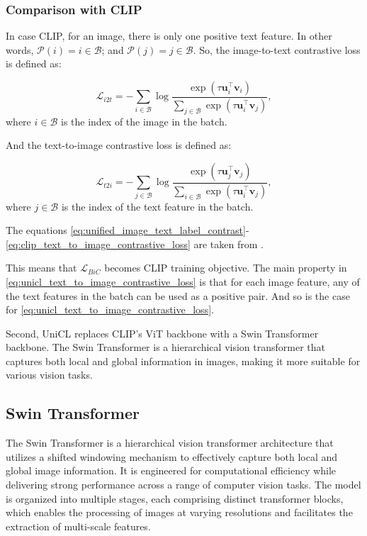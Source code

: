 \subsubsection{Comparison with CLIP}
\label{subsec:clip_vs_unicl}

In case CLIP, for an image, there is only one positive text feature. In other words, $\mathcal{P}(i) = {i} \in \mathcal{B}$; and $\mathcal{P}(j) = {j} \in \mathcal{B}$. So, the image-to-text contrastive loss is defined as:

\begin{equation} \label{eq:clip_image_to_text_contrastive_loss}
    \mathcal{L}_{i2t} = - \sum_{i \in \mathcal{B}} 
    \log \frac{\exp(\tau \mathbf{u}_i^\top \mathbf{v}_i)}{\sum_{j \in \mathcal{B}} \exp(\tau \mathbf{u}_i^\top \mathbf{v}_j)},
\end{equation}
where $i \in \mathcal{B}$ is the index of the image in the batch.

And the text-to-image contrastive loss is defined as:

\begin{equation} \label{eq:clip_text_to_image_contrastive_loss}
    \mathcal{L}_{t2i} = - \sum_{j \in \mathcal{B}} 
    \log \frac{\exp(\tau \mathbf{u}_j^\top \mathbf{v}_j)}{\sum_{i \in \mathcal{B}} \exp(\tau \mathbf{u}_i^\top \mathbf{v}_j)},
\end{equation}
where $j \in \mathcal{B}$ is the index of the text feature in the batch. 

The equations \ref{eq:unified_image_text_label_contrast}-\ref{eq:clip_text_to_image_contrastive_loss} are taken from \cite{vl_unicl}.

This means that $\mathcal{L}_{BiC}$ becomes CLIP training objective. The main property in \autoref{eq:unicl_text_to_image_contrastive_loss} is that for each image feature, any of the text features in the batch can be used as a positive pair. And so is the case for \autoref{eq:unicl_text_to_image_contrastive_loss}.

Second, UniCL replaces CLIP's ViT backbone with a Swin Transformer backbone. The Swin Transformer is a hierarchical vision transformer that captures both local and global information in images, making it more suitable for various vision tasks.

\subsection{Swin Transformer}
\label{subsec:swin_transformer}
The Swin Transformer \cite{transformer_swin} is a hierarchical vision transformer architecture that utilizes a shifted windowing mechanism to effectively capture both local and global image information. It is engineered for computational efficiency while delivering strong performance across a range of computer vision tasks. The model is organized into multiple stages, each comprising distinct transformer blocks, which enables the processing of images at varying resolutions and facilitates the extraction of multi-scale features.

